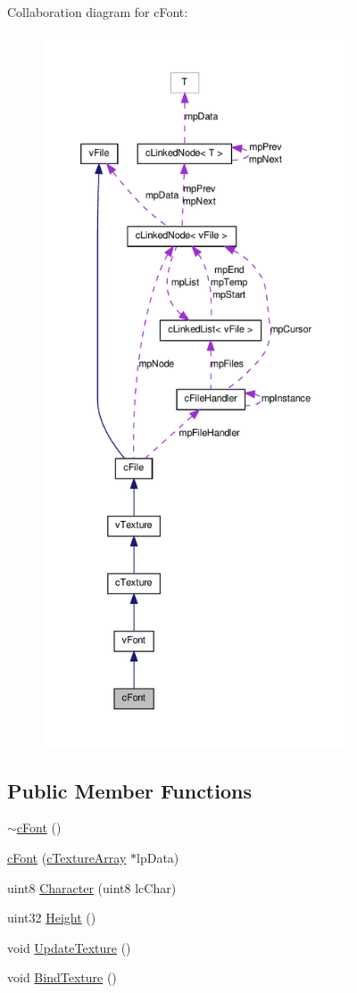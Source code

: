 Collaboration diagram for cFont:
\nopagebreak
\begin{figure}[H]
\begin{center}
\leavevmode
\includegraphics[height=600pt]{classc_font__coll__graph}
\end{center}
\end{figure}
\subsection*{Public Member Functions}
\begin{DoxyCompactItemize}
\item 
\hyperlink{classc_font_aefcd8a6310d772c0ff38fe892b297d08}{$\sim$cFont} ()
\item 
\hyperlink{classc_font_af0305f96b8f6474dc05243637ead7985}{cFont} (\hyperlink{classc_texture_array}{cTextureArray} $\ast$lpData)
\item 
uint8 \hyperlink{classc_font_a0916381aba1071e7dfe1b0544740d377}{Character} (uint8 lcChar)
\item 
uint32 \hyperlink{classc_font_a3fa379c0126af4edd8c4f7bb39507a13}{Height} ()
\item 
void \hyperlink{classc_font_af3dda34ffb9643c124ea4669e33ace2f}{UpdateTexture} ()
\item 
void \hyperlink{classc_font_ac9ca29fcedc25f79d3420676f14d5878}{BindTexture} ()
\end{DoxyCompactItemize}


